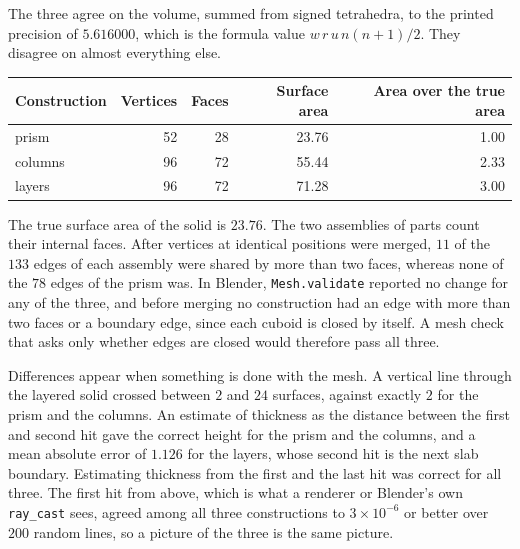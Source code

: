 The three agree on the volume, summed from signed tetrahedra, to the printed precision of $5.616000$, which is the formula value $w\,r\,u\,n(n+1)/2$. They disagree on almost everything else.

\begin{center}
\small
\begin{tabular}{lrrrr}
\toprule
Construction & Vertices & Faces & Surface area & Area over the true area\\
\midrule
prism & 52 & 28 & 23.76 & 1.00\\
columns & 96 & 72 & 55.44 & 2.33\\
layers & 96 & 72 & 71.28 & 3.00\\
\bottomrule
\end{tabular}
\end{center}

The true surface area of the solid is $23.76$. The two assemblies of parts count their internal faces. After vertices at identical positions were merged, $11$ of the $133$ edges of each assembly were shared by more than two faces, whereas none of the $78$ edges of the prism was. In Blender, \texttt{Mesh.validate} reported no change for any of the three, and before merging no construction had an edge with more than two faces or a boundary edge, since each cuboid is closed by itself. A mesh check that asks only whether edges are closed would therefore pass all three.

Differences appear when something is done with the mesh. A vertical line through the layered solid crossed between $2$ and $24$ surfaces, against exactly $2$ for the prism and the columns. An estimate of thickness as the distance between the first and second hit gave the correct height for the prism and the columns, and a mean absolute error of $1.126$ for the layers, whose second hit is the next slab boundary. Estimating thickness from the first and the last hit was correct for all three. The first hit from above, which is what a renderer or Blender's own \texttt{ray\_cast} sees, agreed among all three constructions to $3\times 10^{-6}$ or better over $200$ random lines, so a picture of the three is the same picture.


